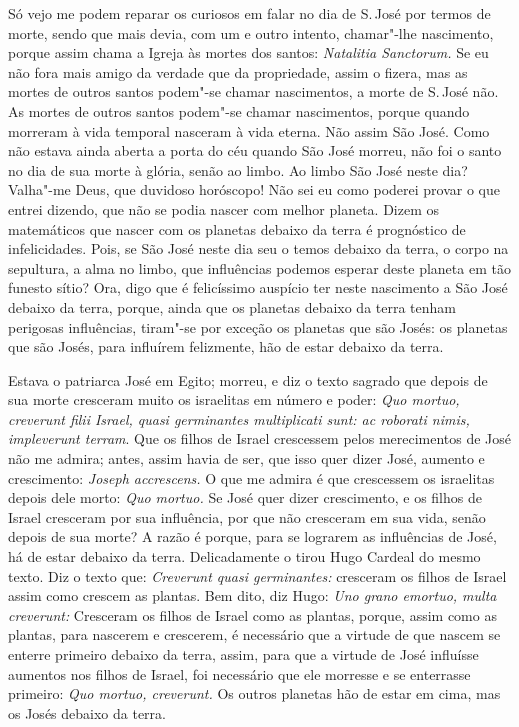 Só vejo me podem reparar os curiosos em falar no dia de S.\,José por
termos de morte, sendo que mais devia, com um e outro intento,
chamar"-lhe nascimento, porque assim chama a Igreja às mortes dos santos:
\emph{Natalitia Sanctorum.} Se eu não fora mais amigo da verdade que
da propriedade, assim o fizera, mas as mortes de outros santos podem"-se
chamar nascimentos, a morte de S.\,José não. As mortes de outros santos
podem"-se chamar nascimentos, porque quando morreram à vida temporal nasceram à
vida eterna. Não assim São José. Como não estava ainda aberta a porta do
céu quando São José morreu, não foi o santo no dia de sua morte à
glória, senão ao limbo. Ao limbo São José neste dia? Valha"-me Deus, que
duvidoso horóscopo! Não sei eu como poderei provar o que entrei dizendo,
que não se podia nascer com melhor planeta. Dizem os matemáticos que nascer com
os planetas debaixo da terra é prognóstico de infelicidades.
Pois, se São José neste dia seu o temos debaixo da terra, o
corpo na sepultura, a alma no limbo, que influências podemos esperar
deste planeta em tão funesto sítio? Ora, digo que é felicíssimo auspício
ter neste nascimento a São José debaixo da terra, porque, ainda que os
planetas debaixo da terra tenham perigosas influências, tiram"-se por
exceção os planetas que são Josés: os planetas que são Josés, para
influírem felizmente, hão de estar debaixo da terra.

Estava o patriarca José em Egito; morreu, e diz o texto sagrado que
depois de sua morte cresceram muito os israelitas em número e poder:
\emph{Quo mortuo, creverunt filii Israel, quasi germinantes multiplicati
sunt: ac roborati nimis, impleverunt terram}. Que os filhos de
Israel crescessem pelos merecimentos de José não me admira; antes, assim
havia de ser, que isso quer dizer José, aumento e crescimento:
\emph{Joseph accrescens.} O que me admira é que crescessem os
israelitas depois dele morto: \emph{Quo mortuo.} Se José quer dizer
crescimento, e os filhos de Israel cresceram por sua influência, por que
não cresceram em sua vida, senão depois de sua morte? A razão é porque,
para se lograrem as influências de José, há de estar debaixo da terra.
Delicadamente o tirou Hugo Cardeal do mesmo texto. Diz o texto que:
\emph{Creverunt quasi germinantes:} cresceram os filhos de Israel assim
como crescem as plantas. Bem dito, diz Hugo: \emph{Uno grano emortuo,
multa creverunt:} Cresceram os filhos de Israel como as plantas, porque,
assim como as plantas, para nascerem e crescerem, é necessário que a
virtude de que nascem se enterre primeiro debaixo da terra, assim, para
que a virtude de José influísse aumentos nos filhos de Israel, foi
necessário que ele morresse e se enterrasse primeiro: \emph{Quo mortuo,
creverunt.} Os outros planetas hão de estar em cima, mas os Josés
debaixo da terra.

